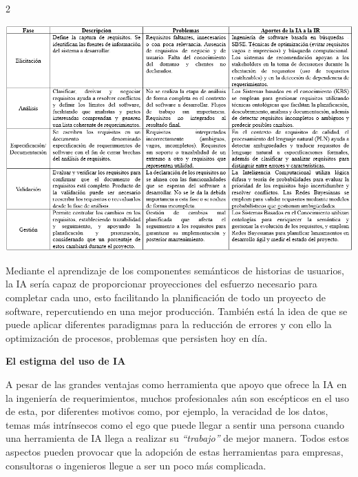 \documentclass[12pt,spanish,Letterpaper,openany]{book}
\begin{document}
\begin {multicols}{2}
\begin {flushleft}
\noindent\begin{minipage}[c]{\columnwidth}

\includegraphics[width=1\linewidth]{imagenes_articulos/sp33_01}

\end{minipage}
\end {flushleft}

Mediante el aprendizaje de los componentes semánticos de historias de usuarios, la IA sería capaz de proporcionar proyecciones del esfuerzo necesario para completar cada uno, esto facilitando la planificación de todo un proyecto de software, repercutiendo en una mejor producción. También está la idea de que se puede aplicar diferentes paradigmas para la reducción de errores y con ello la optimización de procesos, problemas que persisten hoy en día.

\bigskip
\bigskip
\bigskip

\textbf{El estigma del uso de IA}

A pesar de las grandes ventajas como herramienta que apoyo que ofrece la IA en la ingeniería de requerimientos, muchos profesionales aún son escépticos en el uso de esta, por diferentes motivos como, por ejemplo, la veracidad de los datos, temas más intrínsecos como el ego que puede llegar a sentir una persona cuando una herramienta de IA llega a realizar su \emph{``trabajo''} de mejor manera. Todos estos aspectos pueden provocar que la adopción de estas herramientas
para empresas, consultoras o ingenieros llegue a ser un poco más complicada.

\hypertarget{conclusiones-8}{%
}
\end{multicols}
\end{document}

